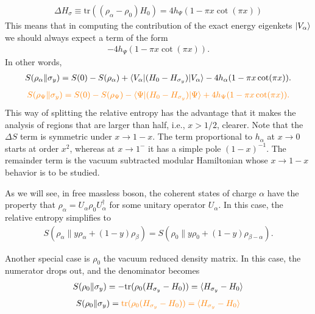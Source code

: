 \documentclass[11pt]{article}
\newcommand{\tr}{\mathrm{tr}}
\newcommand{\nn}{\nonumber}
\newcommand{\JM}[1]{\textcolor{orange}{#1}}
\begin{document}
\begin{align}
\Delta H_\sigma\equiv \text{tr}((\rho_\alpha-\rho_0)H_0)=4h_{\Psi}(1-\pi x\cot(\pi x))
\end{align}
This means that in computing the contribution of the exact energy eigenkets $\ket{V_\alpha}$ we should always expect a term of the form
\begin{align}
  -4h_{\Psi}(1-\pi x\cot(\pi x)).
\end{align}
In other words,
\begin{align}
S(\rho_\alpha\|\sigma_y)=S(0)-S(\rho_\alpha)+\braket{V_\alpha|(H_0-H_{\sigma_y})|V_\alpha}-4h_\alpha(1-\pi x\cot(\pi x)).
\end{align}
\begin{align}
\JM{S(\rho_\Psi\|\sigma_y)=S(0)-S(\rho_\Psi)-\braket{\Psi|(H_0-H_{\sigma_y})|\Psi}+4h_\Psi(1-\pi x\cot(\pi x)).}
\end{align}
This way of splitting the relative entropy has the advantage that it makes the analysis of regions that are larger than half, i.e., $x>1/2$, clearer. Note that the $\Delta S$ term is symmetric under $x\to 1-x$. The term proportional to $h_\alpha$ at $x\to 0$ starts at order $x^2$, whereas at $x\to 1^-$ it has a simple pole $(1-x)^{-1}$. The remainder term is the vacuum subtracted modular Hamiltonian whose $x\to 1-x$ behavior is to be studied. 

As we will see, in free massless boson, the coherent states of charge $\alpha$ have the property that $\rho_\alpha=U_\alpha \rho_0 U_\alpha^\dagger$ for some unitary operator $U_\alpha$. In this case, the relative entropy simplifies to
\begin{align}
S(\rho_\alpha\|y\rho_\alpha+(1-y)\rho_\beta)=S(\rho_0\|y\rho_0+(1-y)\rho_{\beta-\alpha}).
\end{align}



Another special case is $\rho_0$ the vacuum reduced density matrix. In this case, the numerator drops out, and the denominator becomes
\begin{align}
S(\rho_0\|\sigma_y)&=-\tr(\rho_0(H_{\sigma_y}-H_0))=\braket{H_{\sigma_y}-H_0}\nn\\
\end{align}
\begin{align*}
S(\rho_0\|\sigma_y)&=\JM{\tr(\rho_0(H_{\sigma_y}-H_0))=\braket{H_{\sigma_y}-H_0}}\nn\\
\end{align*}
\end{document}
